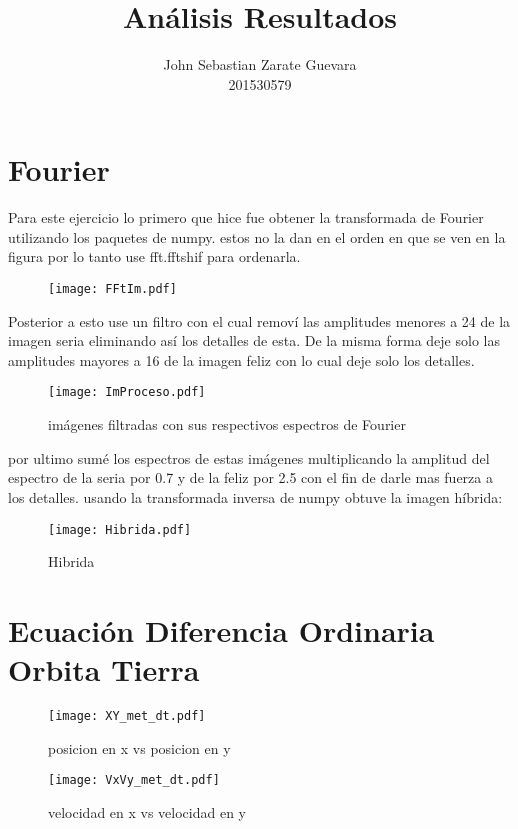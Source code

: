 \documentclass[12pt]{article}
\begin{document}
 

 
\title{Análisis Resultados}
\author{John Sebastian Zarate Guevara\\ 
201530579}


\maketitle
\section{Fourier}
Para este ejercicio lo primero que hice fue obtener la transformada de Fourier utilizando los paquetes de numpy. estos no la dan en el orden en que se ven en la figura por lo tanto use fft.fftshif para ordenarla.
\begin{figure}[ht]
\texttt{[image: FFtIm.pdf]}
\centering
\end{figure}

Posterior a esto use un filtro con el cual removí las amplitudes menores a 24 de la imagen seria eliminando así los detalles de esta. De la misma forma deje solo las amplitudes mayores a 16 de la imagen feliz con lo cual deje solo los detalles.
\begin{figure}[ht]
\texttt{[image: ImProceso.pdf]}
\centering
\caption{imágenes filtradas con sus respectivos espectros de Fourier}
\end{figure}

por ultimo sumé los espectros de estas imágenes multiplicando la amplitud del espectro de la seria por 0.7 y de la feliz por 2.5 con el fin de darle mas fuerza a los detalles. usando la transformada inversa de numpy obtuve la imagen híbrida:

\begin{figure}[ht]
\texttt{[image: Hibrida.pdf]}
\centering
\caption{Hibrida}
\end{figure}

\section{Ecuación Diferencia Ordinaria Orbita Tierra}

\begin{figure}[ht]
\texttt{[image: XY\_met\_dt.pdf]}
\centering
\caption{posicion en x vs posicion en y}
\end{figure}

\begin{figure}[ht]
\texttt{[image: VxVy\_met\_dt.pdf]}
\centering
\caption{velocidad en x vs velocidad en y}
\end{figure}
\end{document}
